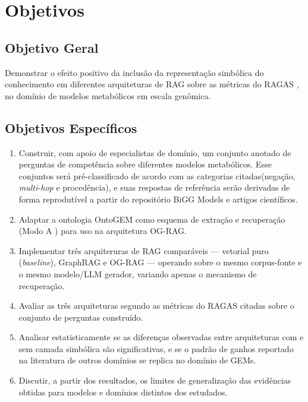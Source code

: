\documentclass{article}
\begin{document}
\section{Objetivos}

\subsection{Objetivo Geral}

Demonstrar o efeito positivo da inclusão da representação simbólica do conhecimento em diferentes arquiteturas de RAG sobre as métricas do RAGAS \cite{es-etal-2024-ragas}, no domínio de modelos metabólicos em escala genômica.

\subsection{Objetivos Específicos}

\begin{enumerate}
	\item Construir, com apoio de especialistas de domínio, um conjunto anotado de perguntas de competência sobre diferentes modelos metabólicos. Esse conjuntos será pré-classificado de acordo com as categorias citadas(negação, \textit{multi-hop} e procedência), e suas respostas de referência serão derivadas de forma reprodutível a partir do repositório BiGG Models e artigos científicos.
	\item Adaptar a ontologia OntoGEM como esquema de extração e recuperação (Modo A \cite{sharma2025ograg}) para uso na arquitetura OG-RAG.
	\item Implementar três arquiteruras de RAG comparáveis --- vetorial puro (\textit{baseline}), GraphRAG e OG-RAG --- operando sobre o mesmo corpus-fonte e o mesmo modelo/LLM gerador, variando apenas o mecanismo de recuperação.
	\item Avaliar as três arquiteturas segundo as métricas do RAGAS citadas sobre o conjunto de perguntas construído.
	\item Analisar estatisticamente se as diferenças observadas entre arquiteturas com e sem camada simbólica são significativas, e se o padrão de ganhos reportado na literatura de outros domínios se replica no domínio de GEMs.
	\item Discutir, a partir dos resultados, os limites de generalização das evidências obtidas para modelos e domínios distintos dos estudados.
\end{enumerate}
\end{document}
